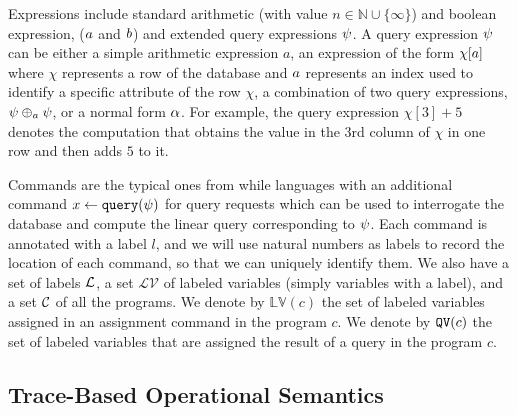 Expressions include
standard arithmetic (with value $n \in \mathbb{N}\cup \{ \infty \}$) and boolean expression, ($a$ and $b$) and extended query expressions $\psi$.
A query expression $\psi$ can be either a simple arithmetic expression $a$, an expression of the form $\chi[a]$ where $\chi$ represents a row of the database  and  $a$ represents an index used to identify a specific attribute of the row $\chi$, a combination of two query expressions, $\psi \oplus_{a} \psi$, or a normal form $\alpha$.
For example, the query expression $\chi[3] + 5$  denotes the computation that
obtains
the value in the $3$rd column of $\chi$ in one row and then adds $5$ to it.

Commands are the typical ones from while languages with an additional command $\mathrel{ x \leftarrow {\tt query}(\psi) }$ for query requests which can be used to interrogate
 the database and compute the linear query corresponding to $\psi$.
Each command is annotated with a label $l$, and we will use natural numbers as labels to record
the location of each command, so that we can uniquely identify them.
We also have a set of labels $\mathcal{L}$, a set $\mathcal{LV}$  of labeled variables (simply variables with a label), and a set $\mathcal{C}$ of all the programs.
We denote by $\mathbb{LV}(c)$ the set of labeled variables assigned in an assignment command in the program $c$.  
We denote by  $\mathtt{QV}(c)$ the set of labeled variables that are assigned the result of a query in the program $c$.




\subsection{ Trace-Based Operational Semantics}

